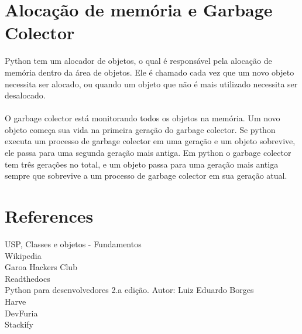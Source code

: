 \documentclass[12pt]{article}
\begin{document}
\section{Alocação de memória e Garbage Colector}

Python tem um alocador de objetos, o qual é responsável pela alocação de memória dentro da área de objetos. Ele é chamado cada vez que um novo objeto necessita ser alocado, ou quando um objeto que não é mais utilizado necessita ser desalocado.
\\\\
O garbage colector está monitorando todos os objetos na memória. Um novo objeto começa sua vida na primeira geração do garbage colector. Se python executa um processo de garbage colector em uma geração e um objeto sobrevive, ele passa para uma segunda geração mais antiga. Em python o garbage colector tem três gerações no total, e um objeto passa para uma geração mais antiga sempre que sobrevive a um processo de garbage colector em sua geração atual.




\section{References}

USP, Classes e objetos - Fundamentos \\
Wikipedia\\
Garoa Hackers Club\\
Readthedocs\\
Python para desenvolvedores 2.a edição. Autor: Luiz Eduardo Borges\\
Harve\\
DevFuria\\
Stackify

\end{document}
